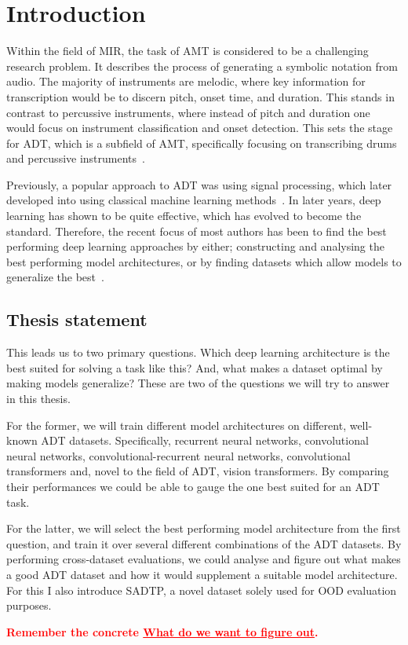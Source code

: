 \chapter{Introduction}

Within the field of \gls{MIR}, the task of \gls{AMT} is considered to be a challenging research problem. It describes the process of generating a symbolic notation from audio. The majority of instruments are melodic, where key information for transcription would be to discern pitch, onset time, and duration. This stands in contrast to percussive instruments, where instead of pitch and duration one would focus on instrument classification and onset detection. This sets the stage for \gls{ADT}, which is a subfield of \gls{AMT}, specifically focusing on transcribing drums and percussive instruments~\cite{8350302}.

Previously, a popular approach to \gls{ADT} was using signal processing, which later developed into using classical machine learning methods~\cite{8350302}. In later years, deep learning has shown to be quite effective, which has evolved to become the standard. Therefore, the recent focus of most authors has been to find the best performing deep learning approaches by either; constructing and analysing the best performing model architectures, or by finding datasets which allow models to generalize the best~\cite{signals4040042}.


\section{Thesis statement}

This leads us to two primary questions. Which deep learning architecture is the best suited for solving a task like this? And, what makes a dataset optimal by making models generalize? These are two of the questions we will try to answer in this thesis. 

For the former, we will train different model architectures on different, well-known \gls{ADT} datasets. Specifically, recurrent neural networks, convolutional neural networks, convolutional-recurrent neural networks, convolutional transformers and, novel to the field of \gls{ADT}, vision transformers. By comparing their performances we could be able to gauge the one best suited for an \gls{ADT} task.

For the latter, we will select the best performing model architecture from the first question, and train it over several different combinations of the \gls{ADT} datasets. By performing cross-dataset evaluations, we could analyse and figure out what makes a good \gls{ADT} dataset and how it would supplement a suitable model architecture. For this I also introduce SADTP, a novel dataset solely used for \gls{OOD} evaluation purposes.

\textcolor{red}{\textbf{Remember the concrete \underline{What do we want to figure out}.}}